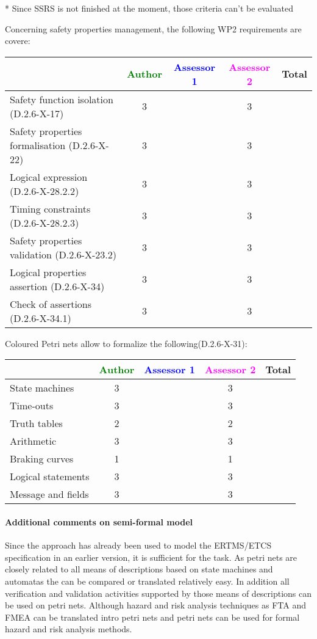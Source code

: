 \begin{assessor2}
* Since SSRS is not finished at the moment, those criteria can't be evaluated
\end{assessor2}

Concerning safety properties management, the following WP2 requirements are covere:

\begin{tabular}{|l | c | c | c | c|}
\hline
& \textcolor{green}{Author} & \textcolor{blue}{Assessor 1} & \textcolor{magenta}{Assessor 2} & Total \\
\hline 
Safety function isolation (D.2.6-X-17)  & 3 & & 3 &  \\
\hline 
Safety properties formalisation (D.2.6-X-22)  & 3 & & 3 &  \\
\hline
Logical expression (D.2.6-X-28.2.2)  & 3 & & 3 &  \\
\hline
Timing constraints (D.2.6-X-28.2.3)  & 3 & & 3 &  \\
\hline
Safety properties validation (D.2.6-X-23.2)  & 3 & & 3 &  \\
\hline
Logical properties assertion (D.2.6-X-34)  & 3 & & 3 &  \\
\hline
Check  of assertions (D.2.6-X-34.1)  & 3 & & 3 &  \\
\hline
\end{tabular}

Coloured Petri nets allow to  formalize the following(D.2.6-X-31):

\begin{tabular}{|l | c | c | c | c|}
\hline
& \textcolor{green}{Author} & \textcolor{blue}{Assessor 1} & \textcolor{magenta}{Assessor 2} & Total \\
\hline 
State machines  & 3 & & 3 &  \\
\hline
Time-outs  & 3 & & 3 &  \\
\hline
Truth tables  & 2 & & 2 &  \\
\hline
Arithmetic  & 3 & & 3 &  \\
\hline
Braking curves  & 1 & & 1 &  \\
\hline
Logical statements & 3 & & 3 &  \\
\hline
Message and fields & 3 & & 3 &  \\
\hline
\end{tabular}

\paragraph{Additional comments on semi-formal  model} 
Since the approach has already been used to model the ERTMS/ETCS specification in an earlier version, it is sufficient for the task.
As petri nets are closely related to all means of descriptions based on state machines and automatas the can be compared or translated relatively easy. In addition all verification and validation activities supported by those means of descriptions can be used on petri nets. Although hazard and risk analysis techniques as FTA and FMEA can be translated intro petri nets and petri nets can be used for formal hazard and risk analysis methods.



